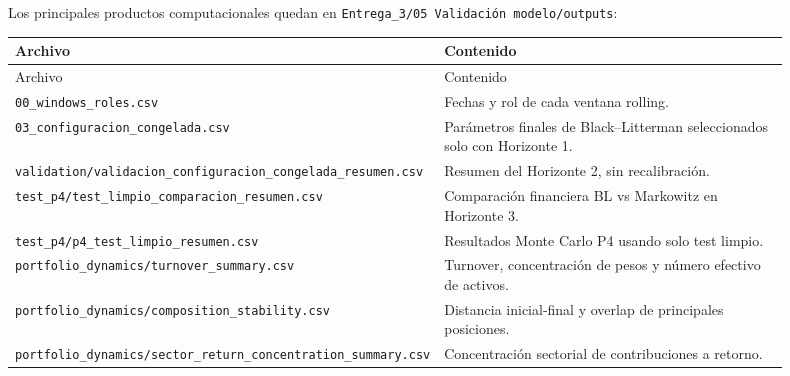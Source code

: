 \documentclass[11pt]{article}
\begin{document}
Los principales productos computacionales quedan en \texttt{Entrega\_3/05 Validaci\'on modelo/outputs}:

\begin{longtable}{p{0.38\linewidth} p{0.52\linewidth}}
\toprule
Archivo & Contenido \\
\midrule
\endfirsthead
\toprule
Archivo & Contenido \\
\midrule
\endhead
\texttt{00\_windows\_roles.csv} & Fechas y rol de cada ventana rolling. \\
\texttt{03\_configuracion\_congelada.csv} & Par\'ametros finales de Black--Litterman seleccionados solo con Horizonte 1. \\
\texttt{validation/validacion\_configuracion\_congelada\_resumen.csv} & Resumen del Horizonte 2, sin recalibraci\'on. \\
\texttt{test\_p4/test\_limpio\_comparacion\_resumen.csv} & Comparaci\'on financiera BL vs Markowitz en Horizonte 3. \\
\texttt{test\_p4/p4\_test\_limpio\_resumen.csv} & Resultados Monte Carlo P4 usando solo test limpio. \\
\texttt{portfolio\_dynamics/turnover\_summary.csv} & Turnover, concentraci\'on de pesos y n\'umero efectivo de activos. \\
\texttt{portfolio\_dynamics/composition\_stability.csv} & Distancia inicial-final y overlap de principales posiciones. \\
\texttt{portfolio\_dynamics/sector\_return\_concentration\_summary.csv} & Concentraci\'on sectorial de contribuciones a retorno. \\
\bottomrule
\end{longtable}
\end{document}
